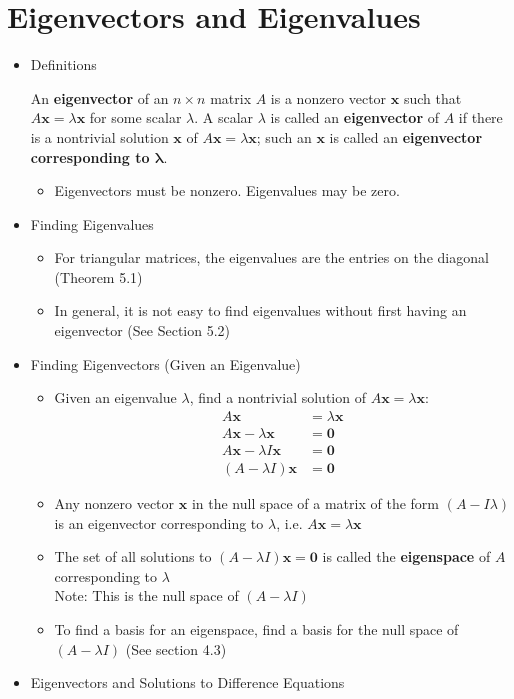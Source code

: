 \documentclass[10pt]{book}
\newenvironment{boxdef}{\begin{mdframed}[backgroundcolor=gray!30,linewidth=0pt,nobreak=true]}{\end{mdframed}}
\newcommand{\vect}[1]{\ensuremath{\boldsymbol{\mathbf{#1}}}}
\newcommand{\Axlx}{A\vect{x}=\lambda\vect{x}}
\begin{document}
\section{Eigenvectors and Eigenvalues}
\begin{itemize}
	\item Definitions
	\begin{boxdef}
		An \textbf{eigenvector} of an $n\times n$ matrix $A$ is a nonzero vector $\vect{x}$ such that $\Axlx$ for some scalar $\lambda$. A scalar $\lambda$ is called an \textbf{eigenvector} of $A$ if there is a nontrivial solution $\vect{x}$ of $\Axlx$; such an $\vect{x}$ is called an \textbf{eigenvector corresponding to $\boldsymbol{\lambda}$}.
	\end{boxdef}
		\begin{itemize}
			\item Eigenvectors must be nonzero. Eigenvalues may be zero.
		\end{itemize}
	\item Finding Eigenvalues
		\begin{itemize}
			\item For triangular matrices, the eigenvalues are the entries on the diagonal (Theorem 5.1)
			\item In general, it is not easy to find eigenvalues without first having an eigenvector (See Section 5.2)
		\end{itemize}
	\item Finding Eigenvectors (Given an Eigenvalue)
		\begin{itemize}
			\item Given an eigenvalue $\lambda$, find a nontrivial solution of $\Axlx$:
				\begin{align*}
				A\vect{x} &= \lambda\vect{x} \\
				A\vect{x} - \lambda\vect{x} &= \vect{0} \\
				A\vect{x} - \lambda I\vect{x} &= \vect{0} \\
				(A-\lambda I)\vect{x} &= \vect{0}
				\end{align*}
			\item Any nonzero vector $\vect{x}$ in the null space of a matrix of the form $(A-I\lambda)$ is an eigenvector corresponding to $\lambda$, i.e. $A\vect{x}=\lambda\vect{x}$
			\item The set of all solutions to $(A-\lambda I)\vect{x}=\vect{0}$ is called the \textbf{eigenspace} of $A$ corresponding to $\lambda$ \\
			Note: This is the null space of $(A-\lambda I)$
			\item To find a basis for an eigenspace, find a basis for the null space of $(A-\lambda I)$ (See section 4.3)
		\end{itemize}
	\item Eigenvectors and Solutions to Difference Equations
\end{itemize}
\end{document}
